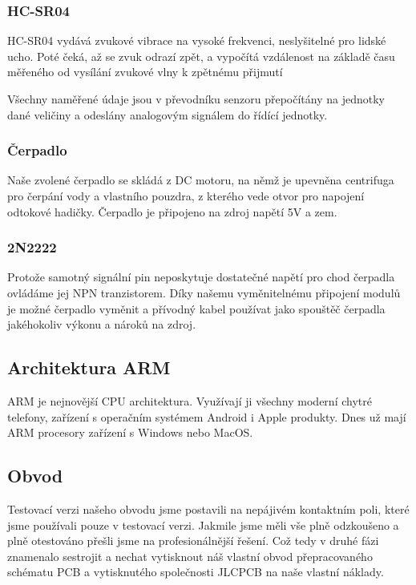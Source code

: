\documentclass[12pt,a4paper]{article}
\begin{document}
\subsubsection{HC-SR04}

HC-SR04 vydává zvukové vibrace na vysoké frekvenci, neslyšitelné pro lidské
ucho. Poté čeká, až se zvuk odrazí zpět, a vypočítá vzdálenost na základě času
měřeného od vysílání zvukové vlny k zpětnému přijmutí

Všechny naměřené údaje jsou v převodníku senzoru přepočítány na jednotky dané
veličiny a odeslány analogovým signálem do řídící jednotky.

\subsubsection{Čerpadlo}

Naše zvolené čerpadlo se skládá z DC motoru, na němž je upevněna centrifuga pro
čerpání vody a vlastního pouzdra, z kterého vede otvor pro napojení odtokové
hadičky. Čerpadlo je připojeno na zdroj napětí 5V a zem.

\subsubsection{2N2222}

Protože samotný signální pin neposkytuje dostatečné napětí pro chod čerpadla
ovládáme jej NPN tranzistorem. Díky našemu vyměnitelnému připojení modulů je
možné čerpadlo vyměnit a přívodný kabel používat jako spouštěč čerpadla
jakéhokoliv výkonu a nároků na zdroj.

\clearpage

\subsection{Architektura ARM}

ARM je nejnovější CPU architektura. Využívají ji všechny moderní chytré telefony, zařízení s operačním systémem Android i Apple produkty. Dnes už mají ARM procesory zařízení s Windows nebo MacOS.


\subsection{Obvod}

Testovací verzi našeho obvodu jsme postavili na nepájivém kontaktním poli,
které jsme používali pouze v testovací verzi. Jakmile jsme měli vše plně
odzkoušeno a plně otestováno přešli jsme na profesionálnější řešení.
Což tedy v druhé fázi znamenalo sestrojit a nechat vytisknout náš vlastní obvod
přepracovaného schématu PCB a vytisknutého společnosti JLCPCB na naše vlastní
náklady.
\end{document}
